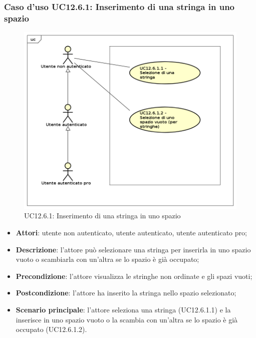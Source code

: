 \subsubsection{Caso d'uso UC12.6.1: Inserimento di una stringa in uno spazio}
\label{UC12.6.1}
\begin{figure}[h]
	\centering
	\includegraphics[scale=0.5]{UML/UC12_6_1.png}
	\caption{UC12.6.1: Inserimento di una stringa in uno spazio}
\end{figure}
\begin{itemize}
\item \textbf{Attori}: utente non autenticato, utente autenticato, utente autenticato pro;
\item \textbf{Descrizione}: l'attore può selezionare una stringa per inserirla in uno spazio vuoto o scambiarla con un'altra se lo spazio è già occupato;
\item \textbf{Precondizione}: l'attore visualizza le stringhe non ordinate e gli spazi vuoti;
\item \textbf{Postcondizione}: l'attore ha inserito la stringa nello spazio selezionato;
\item \textbf{Scenario principale}: l'attore seleziona una stringa (UC12.6.1.1) e la inserisce in uno spazio vuoto o la scambia con un'altra se lo spazio è già occupato (UC12.6.1.2).
\end{itemize}

